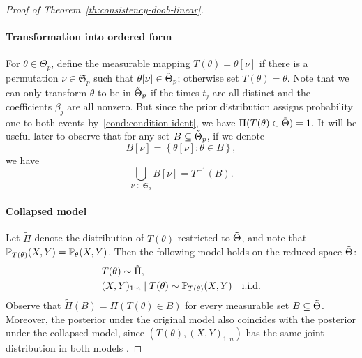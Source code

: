 \begin{proof}[Proof of Theorem~\ref{th:consistency-doob-linear}]
\paragraph{Transformation into ordered form} For \(\theta\in\Theta_p\), define the measurable mapping \(T(\theta)=\theta[\nu]\) if there is a permutation \(\nu\in \mathfrak{S}_p\) such that \(\theta[\nu]\in \tilde{\Theta}_p\); otherwise set \(T(\theta)=\theta\). Note that we can only transform \(\theta\) to be in \(\tilde{\Theta}_p\) if the times \(t_j\) are all distinct and the coefficients \(\beta_j\) are all nonzero. But since the prior distribution assigns probability one to both events by~\ref{cond:condition-ident}, we have \(\Pi(T(\theta)\in\tilde{\Theta})=1\). It will be useful later to observe that for any set \(B\subseteq \tilde{\Theta}_p\), if we denote 
\[
  B[\nu] = \left\{\theta[\nu]: \theta \in B\right\},
\]
we have
\begin{equation}\label{eq:inverse-image-T}
  \bigcup_{\nu\in \mathfrak{S}_p} B[\nu] = T^{-1}(B).
\end{equation}

\paragraph{Collapsed model} Let \(\tilde{\Pi}\) denote the distribution of \(T(\theta)\) restricted to \(\tilde{\Theta}\), and note that \(\mathbb{P}_{T(\theta)}(X,Y)=\mathbb{P}_\theta(X,Y)\). Then the following model holds on the reduced space \(\tilde{\Theta}\):
\begin{equation}\label{eq:model-linear-collapsed}
  \begin{split}
     & T(\theta) \sim \tilde{\Pi}, \\
     & (X,Y)_{1:n}\mid T(\theta) \sim \mathbb{P}_{T(\theta)}(X,Y) \quad \text{i.i.d.}
  \end{split}
\end{equation}
Observe that \(\tilde{\Pi}(B)=\Pi(T(\theta)\in B)\) for every measurable set \(B\subseteq \tilde{\Theta}\). Moreover, the posterior under the original model also coincides with the posterior under the collapsed model, since \((T(\theta), (X,Y)_{1:n})\) has the same joint distribution in both models \citep[see][for details]{miller2023consistency}.


\end{proof}
